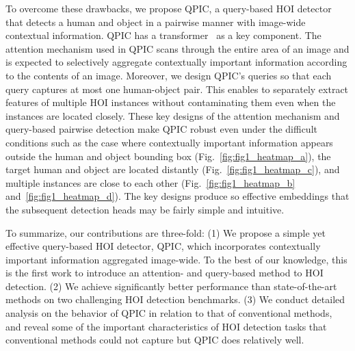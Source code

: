 \documentclass[final]{cvpr}
\begin{document}
To overcome these drawbacks, we propose QPIC, a query-based HOI detector that detects a human and object in a pairwise manner with image-wide contextual information. 
QPIC has a transformer~\cite{vaswani_nips2017} as a key component.
The attention mechanism used in QPIC scans through the entire area of an image and is expected to selectively aggregate contextually important information according to the contents of an image.
Moreover, we design QPIC's queries so that each query captures at most one human-object pair.
This enables to separately extract features of multiple HOI instances without contaminating them even when the instances are located closely.
These key designs of the attention mechanism and query-based pairwise detection make QPIC robust even under the difficult conditions such as the case where contextually important information appears outside the human and object bounding box (Fig.~\ref{fig:fig1_heatmap_a}), the target human and object are located distantly (Fig.~\ref{fig:fig1_heatmap_c}), and multiple instances are close to each other (Fig.~\ref{fig:fig1_heatmap_b} and~\ref{fig:fig1_heatmap_d}).
The key designs produce so effective embeddings that the subsequent detection heads may be fairly simple and intuitive.  

To summarize, our contributions are three-fold: 
(1) We propose a simple yet effective query-based HOI detector, QPIC, which incorporates contextually important information aggregated image-wide. To the best of our knowledge, this is the first work to introduce an attention- and query-based method to HOI detection. 
(2) We achieve significantly better performance than state-of-the-art methods on two challenging HOI detection benchmarks. 
(3) We conduct detailed analysis on the behavior of QPIC in relation to that of conventional methods, and reveal some of the important characteristics of HOI detection tasks that conventional methods could not capture but QPIC does relatively well.
\end{document}
